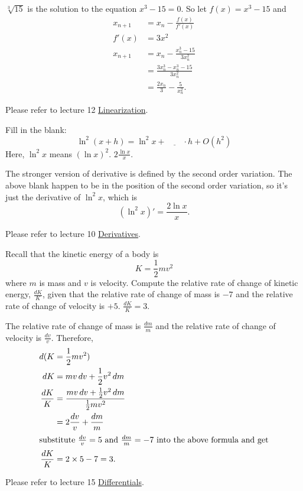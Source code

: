     {\parasp $ \sqrt[3]{15} $ is the solution to the equation $ x^3 - 15 = 0 $.
    So let $ f(x) = x^3 - 15 $ and
    \begin{align*}
      x_{n+1} &= x_n - \frac{f(x)}{f'(x)} \\
      f'(x) &= 3x^2 \\
      x_{n+1} &= x_n - \frac{x_n^3 - 15}{3x_n^2} \\
      &= \frac{3x_n^3 - x_n^3 - 15}{3x_n^2} \\
      &= \frac{2x_n}{3} - \frac{5}{x_n^2}.
    \end{align*}
    
    Please refer to lecture 12
    \href{https://class.coursera.org/calcsing-007/lecture/296}{Linearization}.}
  
    {Fill in the blank:
    \[ \ln^2(x+h) = \ln^2 x + \underline{\qquad}\cdot h + O(h^2) \]
    Here, $ \ln^2 x $ means $ (\ln x)^2 $.}
    {$ 2\frac{\ln x}{x} $.}
    
    {\parasp The stronger version of derivative is defined by the second order
    variation. The above blank happen to be in the position of the second order
    variation, so it's just the derivative of $ \ln^2 x $, which is
    \[ (\ln^2 x)' = \frac{2\ln x}{x}. \]
    
    Please refer to lecture 10
    \href{https://class.coursera.org/calcsing-007/lecture/292}{Derivatives}.}
  
    {Recall that the kinetic energy of a body is
    \[ K = \frac{1}{2}mv^2 \]
    where $ m $ is mass and $ v $ is velocity. Compute the relative rate of
    change of kinetic energy, $ \frac{dK}{K} $, given that the relative rate of
    change of mass is $ -7 $ and the relative rate of change of velocity is
    $ +5 $.}
    {$ \frac{dK}{K}=3 $.}
    
    {\parasp The relative rate of change of mass is $ \frac{dm}{m} $ and the
    relative rate of change of velocity is $ \frac{dv}{v} $. Therefore,
    \begin{align*}
      d( K &= \frac{1}{2} mv^2 ) \\
      dK &= mv \, dv + \frac{1}{2} v^2 \, dm \\
      \frac{dK}{K} &= \frac{mv \, dv + \frac{1}{2} v^2 \, dm}
        {\frac{1}{2} mv^2} \\
        &= 2\frac{dv}{v} + \frac{dm}{m} \\
      \intertext{substitute $ \frac{dv}{v} = 5 $ and $ \frac{dm}{m} = -7 $ into 
      the above formula and get}
      \frac{dK}{K} &= 2 \times 5 - 7 = 3.
    \end{align*}
    
    Please refer to lecture 15
    \href{https://class.coursera.org/calcsing-007/lecture/312}{Differentials}.}
  
